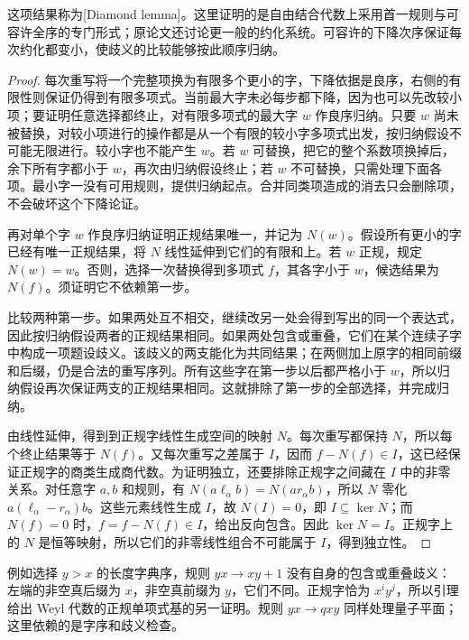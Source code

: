 这项结果称为[Diamond lemma]。这里证明的是自由结合代数上采用首一规则与可容许全序的专门形式；原论文还讨论更一般的约化系统\cite{Bergman1978DiamondLemma}。可容许的下降次序保证每次约化都变小，使歧义的比较能够按此顺序归纳。

\begin{proof}
	每次重写将一个完整项换为有限多个更小的字，下降依据是良序，右侧的有限性则保证仍得到有限多项式。当前最大字未必每步都下降，因为也可以先改较小项；要证明任意选择都终止，对有限多项式的最大字 \(w\) 作良序归纳。只要 \(w\) 尚未被替换，对较小项进行的操作都是从一个有限的较小字多项式出发，按归纳假设不可能无限进行。较小字也不能产生 \(w\)。若 \(w\) 可替换，把它的整个系数项换掉后，余下所有字都小于 \(w\)，再次由归纳假设终止；若 \(w\) 不可替换，只需处理下面各项。最小字一没有可用规则，提供归纳起点。合并同类项造成的消去只会删除项，不会破坏这个下降论证。

	再对单个字 \(w\) 作良序归纳证明正规结果唯一，并记为 \(N(w)\)。假设所有更小的字已经有唯一正规结果，将 \(N\) 线性延伸到它们的有限和上。若 \(w\) 正规，规定 \(N(w)=w\)。否则，选择一次替换得到多项式 \(f\)，其各字小于 \(w\)，候选结果为 \(N(f)\)。须证明它不依赖第一步。

	比较两种第一步。如果两处互不相交，继续改另一处会得到写出的同一个表达式，因此按归纳假设两者的正规结果相同。如果两处包含或重叠，它们在某个连续子字中构成一项题设歧义。该歧义的两支能化为共同结果；在两侧加上原字的相同前缀和后缀，仍是合法的重写序列。所有这些字在第一步以后都严格小于 \(w\)，所以归纳假设再次保证两支的正规结果相同。这就排除了第一步的全部选择，并完成归纳。

	由线性延伸，得到到正规字线性生成空间的映射 \(N\)。每次重写都保持 \(N\)，所以每个终止结果等于 \(N(f)\)。又每次重写之差属于 \(I\)，因而 \(f-N(f)\in I\)，这已经保证正规字的商类生成商代数。为证明独立，还要排除正规字之间藏在 \(I\) 中的非零关系。对任意字 \(a,b\) 和规则，有 \(N(a\ell_\alpha b)=N(ar_\alpha b)\)，所以 \(N\) 零化 \(a(\ell_\alpha-r_\alpha)b\)。这些元素线性生成 \(I\)，故 \(N(I)=0\)，即 \(I\subseteq\ker N\)；而 \(N(f)=0\) 时，\(f=f-N(f)\in I\)，给出反向包含。因此 \(\ker N=I\)。正规字上的 \(N\) 是恒等映射，所以它们的非零线性组合不可能属于 \(I\)，得到独立性。
\end{proof}

例如选择 \(y>x\) 的长度字典序，规则 \(yx\to xy+1\) 没有自身的包含或重叠歧义：左端的非空真后缀为 \(x\)，非空真前缀为 \(y\)，它们不同。正规字恰为 \(x^iy^j\)，所以引理给出 Weyl 代数的正规单项式基的另一证明。规则 \(yx\to qxy\) 同样处理量子平面；这里依赖的是字序和歧义检查。

